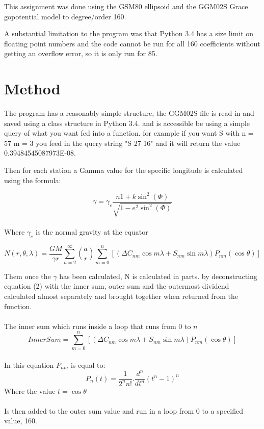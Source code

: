 \documentclass[12pt,a4paper]{article}
\begin{document}
	This assignment was done using the GSM80 ellipsoid and the GGM02S Grace gopotential model to degree/order 160.
	
	A substantial limitation to the program was that Python 3.4 has a size limit on floating point numbers and the code cannot be run for all 160 coefficients without getting an overflow error, so it is only run for 85.
	
	\newpage
	\section{Method}
	
	The program has a reasonably simple structure, the GGM02S file is read in and saved using a class structure in Python 3.4. and is accessible be using a simple query of what you want fed into a function. for example if you want S with n = 57 m = 3 you feed in the query string "S 27 16" and it will return the value 0.39484545087973E-08.
	
	Then for each station a Gamma value for the specific longitude is calculated using the formula:
	
	\begin{equation}
		\gamma = \gamma_e  \frac{n1 + k \sin^2(\Phi)}{\sqrt{1 - e^2 \sin^2(\Phi)}}
	\end{equation}
	\\
	Where $\gamma_e$ is the normal gravity at the equator
	
	\begin{equation}
		N(r, \theta, \lambda) = \frac{GM}{\gamma r} \sum_{n=2}^{\infty} \binom{a}{r} \sum_{m=0}^{n} [(\Delta C_{nm} \cos m\lambda + S_{nm}\sin m\lambda) P_{nm}(\cos\theta)]
	\end{equation}
		
	Them once the $\gamma$ has been calculated, N is calculated in parts. by deconstructing equation (2)  with the inner sum, outer sum and the outermost dividend calculated almost separately and brought together when returned from the function.\\
	\\
	The inner sum which runs inside a loop that runs from 0 to $n$
	\begin{equation}
		InnerSum = \sum_{m=0}^{n} [(\Delta C_{nm} \cos m\lambda + S_{nm}\sin m\lambda) P_{nm}(\cos\theta)]
	\end{equation}
	\\
	In this equation $P_{nm}$ is equal to:
	\begin{equation}
		P_n(t) = \frac{1}{2^n n!} . \frac{d^n}{dt^n} (t^n - 1)^n
	\end{equation}
	Where the value $t = \cos\theta$\\
	\\
	Is then added to the outer sum value and run in a loop from 0 to a specified value, 160.
	
\end{document}
